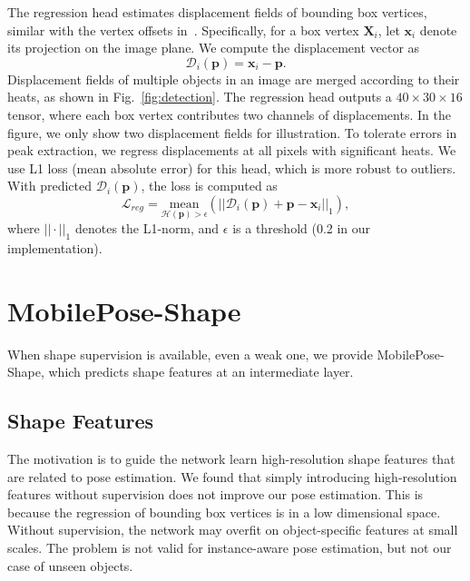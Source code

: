 \documentclass[runningheads]{llncs}
\begin{document}
The regression head estimates displacement fields of bounding box vertices, similar with the vertex offsets in~\cite{Hu_2019_Segmentation}. Specifically, for a box vertex $\mathbf{X}_i$, let $\mathbf{x}_i$ denote its projection on the image plane. We compute the displacement vector as
\begin{equation}
\label{eq:distance}
\mathcal{D}_i(\mathbf{p}) = \mathbf{x}_i - \mathbf{p}. 
\end{equation}
Displacement fields of multiple objects in an image are merged according to their heats, as shown in Fig.~\ref{fig:detection}. The regression head outputs a $40\times30\times16$ tensor, where each box vertex contributes two channels of displacements. In the figure, we only show two displacement fields for illustration. To tolerate errors in peak extraction, we regress displacements at all pixels with significant heats. We use L1 loss (mean absolute error) for this head, which is more robust to outliers. With predicted $\mathcal{D}_i(\mathbf{p})$, the loss is computed as
\begin{equation}
    \mathcal{L}_{reg}= \underset{\mathcal{H}(\mathbf{p})>\epsilon}{\text{mean}}(
    ||\mathcal{D}_i(\mathbf{p}) + \mathbf{p} - \mathbf{x}_i||_1),
\end{equation}
where $||\cdot||_1$ denotes the L1-norm, and $\epsilon$ is a threshold (0.2 in our implementation).

\section{MobilePose-Shape}
When shape supervision is available, even a weak one, we provide MobilePose-Shape, which predicts shape features at an intermediate layer.

\subsection{Shape Features}
The motivation is to guide the network learn high-resolution shape features that are related to pose estimation. We found that simply introducing high-resolution features without supervision does not improve our pose estimation. This is because the regression of bounding box vertices is in a low dimensional space. Without supervision, the network may overfit on object-specific features at small scales. The problem is not valid for instance-aware pose estimation, but not our case of unseen objects. 
\end{document}
